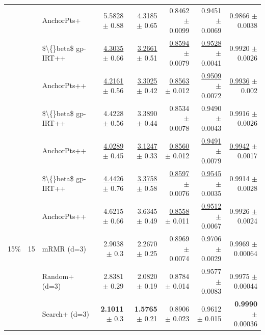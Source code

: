 \begin{longtable}{llp{}rrrrr}
 &  & AnchorPts+ & 5.5828 {\scriptsize $\pm$ 0.88} & 4.3185 {\scriptsize $\pm$ 0.65} & 0.8462 {\scriptsize $\pm$ 0.0099} & 0.9451 {\scriptsize $\pm$ 0.0069} & 0.9866 {\scriptsize $\pm$ 0.0038} \\
 &  & \$\textbackslash\{\}beta\$ gp-IRT++ & \underline{4.3035} {\scriptsize $\pm$ 0.66} & \underline{3.2661} {\scriptsize $\pm$ 0.51} & \underline{0.8594} {\scriptsize $\pm$ 0.0079} & \underline{0.9528} {\scriptsize $\pm$ 0.0041} & 0.9920 {\scriptsize $\pm$ 0.0026} \\
 &  & AnchorPts++ & \underline{4.2161} {\scriptsize $\pm$ 0.56} & \underline{3.3025} {\scriptsize $\pm$ 0.42} & \underline{0.8563} {\scriptsize $\pm$ 0.012} & \underline{0.9509} {\scriptsize $\pm$ 0.0072} & \underline{0.9936} {\scriptsize $\pm$ 0.002} \\
 &  & \$\textbackslash\{\}beta\$ gp-IRT++ & 4.4228 {\scriptsize $\pm$ 0.56} & 3.3890 {\scriptsize $\pm$ 0.44} & 0.8534 {\scriptsize $\pm$ 0.0078} & 0.9490 {\scriptsize $\pm$ 0.0043} & 0.9916 {\scriptsize $\pm$ 0.0026} \\
 &  & AnchorPts++ & \underline{4.0289} {\scriptsize $\pm$ 0.45} & \underline{3.1247} {\scriptsize $\pm$ 0.33} & \underline{0.8560} {\scriptsize $\pm$ 0.012} & \underline{0.9491} {\scriptsize $\pm$ 0.0079} & \underline{0.9942} {\scriptsize $\pm$ 0.0017} \\
 &  & \$\textbackslash\{\}beta\$ gp-IRT++ & \underline{4.4426} {\scriptsize $\pm$ 0.76} & \underline{3.3758} {\scriptsize $\pm$ 0.58} & \underline{0.8597} {\scriptsize $\pm$ 0.0076} & \underline{0.9545} {\scriptsize $\pm$ 0.0035} & 0.9914 {\scriptsize $\pm$ 0.0028} \\
 &  & AnchorPts++ & 4.6215 {\scriptsize $\pm$ 0.66} & 3.6345 {\scriptsize $\pm$ 0.49} & \underline{0.8558} {\scriptsize $\pm$ 0.011} & \underline{0.9512} {\scriptsize $\pm$ 0.0067} & 0.9926 {\scriptsize $\pm$ 0.0024} \\
\midrule
15\% & 15 & mRMR (d=3) & 2.9038 {\scriptsize $\pm$ 0.3} & 2.2670 {\scriptsize $\pm$ 0.25} & 0.8969 {\scriptsize $\pm$ 0.0074} & 0.9706 {\scriptsize $\pm$ 0.0029} & 0.9969 {\scriptsize $\pm$ 0.00064} \\
 &  & Random+ (d=3) & 2.8381 {\scriptsize $\pm$ 0.29} & 2.0820 {\scriptsize $\pm$ 0.19} & 0.8784 {\scriptsize $\pm$ 0.014} & 0.9577 {\scriptsize $\pm$ 0.0083} & 0.9975 {\scriptsize $\pm$ 0.00044} \\
 &  & Search+ (d=3) & \textbf{2.1011} {\scriptsize $\pm$ 0.3} & \textbf{1.5765} {\scriptsize $\pm$ 0.21} & 0.8906 {\scriptsize $\pm$ 0.023} & 0.9612 {\scriptsize $\pm$ 0.015} & \textbf{0.9990} {\scriptsize $\pm$ 0.00036} \\

\end{longtable}
